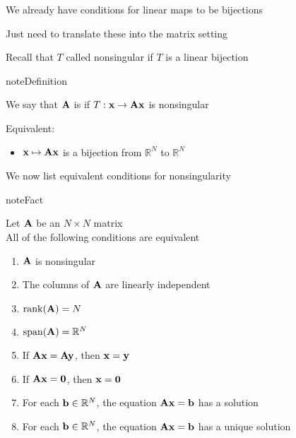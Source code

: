 \documentclass[letterpaper,10pt,english]{jupyterBook}
\begin{document}
\sphinxAtStartPar
We already have conditions for linear maps to be bijections

\sphinxAtStartPar
Just need to translate these into the matrix setting

\sphinxAtStartPar
Recall that \(T\) called nonsingular if \(T\) is a linear bijection

\begin{sphinxadmonition}{note}{Definition}

\sphinxAtStartPar
We say that \({\bf A}\) is  if \(T: {\bf x} \to {\bf A}{\bf x}\) is nonsingular
\end{sphinxadmonition}

\sphinxAtStartPar
Equivalent:
\begin{itemize}
\item {} 
\sphinxAtStartPar
\({\bf x} \mapsto {\bf A} {\bf x}\) is a bijection from \(\mathbb{R}^N\) to \(\mathbb{R}^N\)

\end{itemize}

\sphinxAtStartPar
We now list equivalent conditions for nonsingularity

\begin{sphinxadmonition}{note}{Fact}

\sphinxAtStartPar
Let \({\bf A}\) be an \(N \times N\) matrix \\
All of the following conditions are equivalent
\begin{enumerate}
%
\item {} 
\sphinxAtStartPar
\({\bf A}\) is nonsingular

\item {} 
\sphinxAtStartPar
The columns of \({\bf A}\) are linearly independent

\item {} 
\sphinxAtStartPar
\(\mathrm{rank}({\bf A}) = N\)

\item {} 
\sphinxAtStartPar
\(\mathrm{span}({\bf A}) = \mathbb{R}^N\)

\item {} 
\sphinxAtStartPar
If \({\bf A} {\bf x} = {\bf A} {\bf y}\), then \({\bf x} = {\bf y}\)

\item {} 
\sphinxAtStartPar
If \({\bf A} {\bf x} = {\bf 0}\), then \({\bf x} = {\bf 0}\)

\item {} 
\sphinxAtStartPar
For each \({\bf b} \in \mathbb{R}^N\), the equation \({\bf A} {\bf x} = {\bf b}\) has a solution

\item {} 
\sphinxAtStartPar
For each \({\bf b} \in \mathbb{R}^N\), the equation \({\bf A} {\bf x} = {\bf b}\) has a unique solution

\end{enumerate}
\end{sphinxadmonition}
\end{document}
